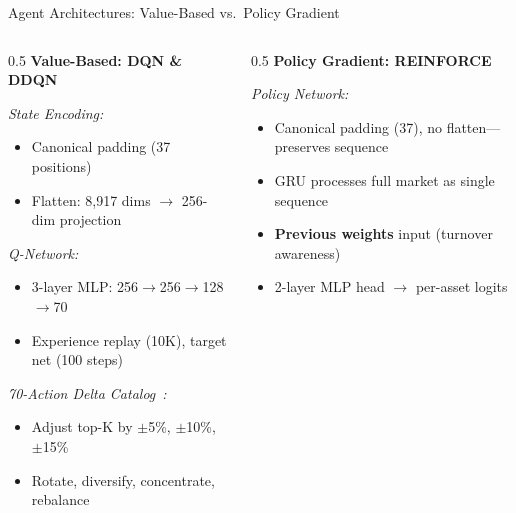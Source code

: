 \documentclass[aspectratio=169]{beamer}
\begin{document}
\begin{frame}{Agent Architectures: Value-Based vs.\ Policy Gradient}
\scriptsize

\begin{columns}[T,totalwidth=\textwidth]
\begin{column}{0.5\textwidth}
\textbf{Value-Based: DQN \& DDQN}~\citep{mnih2015dqn,vanHasselt2016ddqn}

\vspace{0.2em}
\textit{State Encoding:}
\begin{itemize}\setlength{\itemsep}{1pt}
  \item Canonical padding (37 positions)
  \item Flatten: 8,917 dims $\rightarrow$ 256-dim projection
\end{itemize}

\vspace{0.1em}
\textit{Q-Network:}
\begin{itemize}\setlength{\itemsep}{1pt}
  \item 3-layer MLP: 256$\rightarrow$256$\rightarrow$128$\rightarrow$70
  \item Experience replay (10K), target net (100 steps)
\end{itemize}

\vspace{0.1em}
\textit{70-Action Delta Catalog}~\citep{lucarelli2020dqlcrypto}\textit{:}
\begin{itemize}\setlength{\itemsep}{1pt}
  \item Adjust top-K by $\pm$5\%, $\pm$10\%, $\pm$15\%
  \item Rotate, diversify, concentrate, rebalance
\end{itemize}
\end{column}

\begin{column}{0.5\textwidth}
\textbf{Policy Gradient: REINFORCE}~\citep{williams1992reinforce}

\vspace{0.2em}
\textit{Policy Network:}
\begin{itemize}\setlength{\itemsep}{1pt}
  \item Canonical padding (37), no flatten---preserves sequence~\citep{jiang2016drlt}
  \item GRU processes full market as single sequence
  \item \textbf{Previous weights} input (turnover awareness)
  \item 2-layer MLP head $\rightarrow$ per-asset logits
\end{itemize}


\end{column}
\end{columns}
\end{frame}
\end{document}
